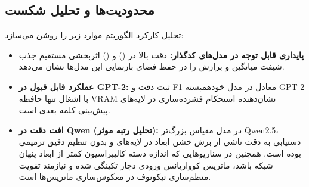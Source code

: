 \subsection{محدودیت‌ها و تحلیل شکست}
تحلیل کارکرد الگوریتم  موارد زیر را روشن می‌سازد:
\begin{itemize}
\item \textbf{پایداری قابل توجه در مدل‌های کدگذار:} دقت بالا در  () و  () اثربخشی مستقیم جذب شیفت میانگین و برازش  را در حفظ فضای بازنمایی این مدل‌ها نشان می‌دهد.
\item \textbf{عملکرد قابل قبول در GPT-2:} ثبت دقت  و F1 معادل  در مدل خودهمبسته GPT-2 با اشغال تنها  حافظه VRAM نشان‌دهنده استحکام فشرده‌سازی در لایه‌های پیش‌بینی کلمه بعدی است.
\item \textbf{افت دقت در Qwen (تحلیل رتبه موثر):} در مدل مقیاس بزرگ‌تر Qwen2.5، دستیابی به دقت  ناشی از برش خشن ابعاد در لایه‌های  و  بدون تنظیم دقیق ترمیمی بوده است. همچنین در سناریوهایی که اندازه دسته کالیبراسیون کمتر از ابعاد پنهان شبکه باشد، ماتریس کوواریانس ورودی دچار تکینگی شده و نیازمند تقویت منظم‌سازی تیکونوف در معکوس‌سازی ماتریس‌ها است.
\end{itemize}
